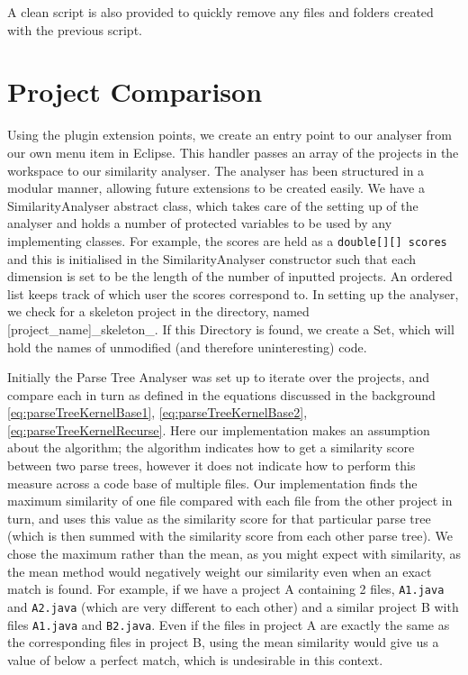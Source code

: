 A clean script is also provided to quickly remove any files and folders created with
the previous script.

\section{Project Comparison}

Using the plugin extension points,
we create an entry point to our analyser from our own menu item in Eclipse. This
handler passes an array of the projects in the workspace to our similarity analyser.
The analyser has been structured in a modular manner, allowing future extensions
to be created easily. We have a SimilarityAnalyser abstract class, which takes
care of the setting up of the analyser and holds a number of protected variables
to be used by any implementing classes. For example, the scores are held as a
\texttt{double[][] scores} and this is initialised in the SimilarityAnalyser
constructor such that each dimension is set to be the length of the number of
inputted projects. An ordered list keeps track of which user the scores correspond
to. In setting up the analyser, we check for a skeleton project in the directory,
named [project\_name]\_skeleton\_. If this Directory is found, we create a Set,
which will hold the names of unmodified (and therefore uninteresting) code.

Initially the Parse Tree Analyser was set up to iterate over the projects, and
compare each in turn as defined in the equations discussed in the background 
\cref{eq:parseTreeKernelBase1}, \cref{eq:parseTreeKernelBase2},
\cref{eq:parseTreeKernelRecurse}. Here our implementation makes an assumption about
the algorithm; the algorithm indicates how to get a similarity score between two 
parse trees, however it does not indicate how to perform this measure across a code
base of multiple files. Our implementation finds the maximum similarity of one file
compared with each file from the other project in turn, and uses this value as the
similarity score for that particular parse tree (which is then summed with the similarity
score from each other parse tree). We chose the maximum rather than the mean, as
you might expect with similarity, as the mean method would negatively weight our
similarity even when an exact match is found. For example, if we have a project A
containing 2 files, \texttt{A1.java} and \texttt{A2.java} (which are very different
to each other) and a similar project B with files \texttt{A1.java} and \texttt{B2.java}.
Even if the files in project A are exactly the same as the corresponding files in
project B, using the mean similarity would give us a value of below a perfect match,
which is undesirable in this context.

